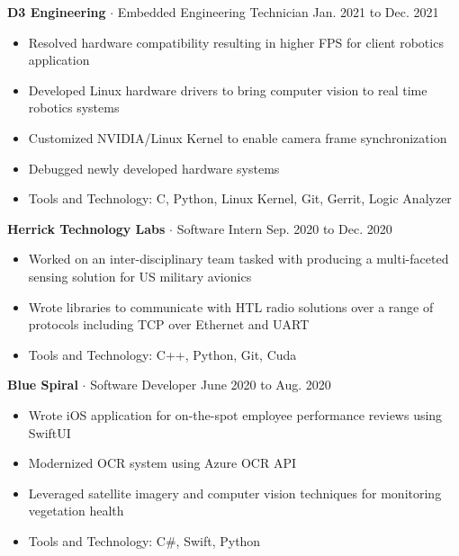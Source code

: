 \documentclass{article}
\newcommand{\rSubSubSection}[1] {
  \textbf{#1}
}
\begin{document}
\vspace{1pt}
\rSubSubSection{D3 Engineering} $\cdot$ Embedded Engineering Technician \hfill Jan. 2021 to Dec. 2021 \par
\begin{itemize}[leftmargin=*]
    \item Resolved hardware compatibility resulting in higher FPS for client robotics application
    \item Developed Linux hardware drivers to bring computer vision to real time robotics systems
    \item Customized NVIDIA/Linux Kernel to enable camera frame synchronization
    \item Debugged newly developed hardware systems
    \item Tools and Technology: C, Python, Linux Kernel, Git, Gerrit, Logic Analyzer
\end{itemize}

\vspace{1pt}
\rSubSubSection{Herrick Technology Labs} $\cdot$ Software Intern \hfill Sep. 2020 to Dec. 2020 \par
\begin{itemize}[leftmargin=*]
    \item Worked on an inter-disciplinary team tasked with producing a multi-faceted sensing solution for US military avionics
    \item Wrote libraries to communicate with HTL radio solutions over a range of protocols including TCP over Ethernet and UART
    \item Tools and Technology: C++, Python, Git, Cuda
\end{itemize}

\vspace{1pt}
\rSubSubSection{Blue Spiral} $\cdot$ Software Developer \hfill June 2020 to Aug. 2020 \par
\begin{itemize}[leftmargin=*]
    \item Wrote iOS application for on-the-spot employee performance reviews using SwiftUI
    \item Modernized OCR system using Azure OCR API
    \item Leveraged satellite imagery and computer vision techniques for monitoring vegetation health
    \item Tools and Technology: C\#, Swift, Python
\end{itemize}
\end{document}
